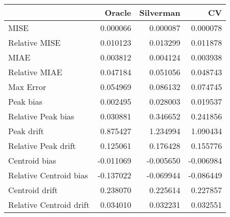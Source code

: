 \begin{tabular}{lrrr}
  \hline
 & Oracle & Silverman & CV \\ 
  \hline
MISE & 0.000066 & 0.000087 & 0.000078 \\ 
  Relative MISE & 0.010123 & 0.013299 & 0.011878 \\ 
  MIAE & 0.003812 & 0.004124 & 0.003938 \\ 
  Relative MIAE & 0.047184 & 0.051056 & 0.048743 \\ 
  Max Error & 0.054969 & 0.086132 & 0.074745 \\ 
  Peak bias & 0.002495 & 0.028003 & 0.019537 \\ 
  Relative Peak bias & 0.030881 & 0.346652 & 0.241856 \\ 
  Peak drift & 0.875427 & 1.234994 & 1.090434 \\ 
  Relative Peak drift & 0.125061 & 0.176428 & 0.155776 \\ 
  Centroid bias & -0.011069 & -0.005650 & -0.006984 \\ 
  Relative Centroid bias & -0.137022 & -0.069944 & -0.086449 \\ 
  Centroid drift & 0.238070 & 0.225614 & 0.227857 \\ 
  Relative Centroid drift & 0.034010 & 0.032231 & 0.032551 \\ 
   \hline
\end{tabular}

